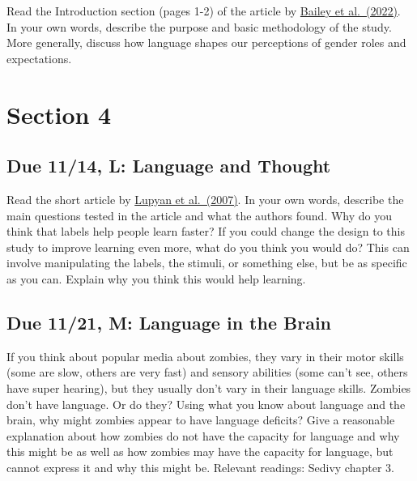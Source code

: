 \documentclass[
  letterpaper,
  DIV=11,
  numbers=noendperiod]{scrreprt}
\begin{document}
Read the Introduction section (pages 1-2) of the article by
\href{papers/Baileyetal2022.pdf}{Bailey et al.~(2022)}. In your own
words, describe the purpose and basic methodology of the study. More
generally, discuss how language shapes our perceptions of gender roles
and expectations.

\hypertarget{section-4}{%
\section*{\texorpdfstring{{Section 4}}{Section 4}}\label{section-4}}


\hypertarget{due-1114-l-language-and-thought}{%
\subsection*{Due 11/14, L: Language and
Thought}\label{due-1114-l-language-and-thought}}

Read the short article by \href{papers/Lupyanetal2007.pdf}{Lupyan et
al.~(2007)}. In your own words, describe the main questions tested in
the article and what the authors found. Why do you think that labels
help people learn faster? If you could change the design to this study
to improve learning even more, what do you think you would do? This can
involve manipulating the labels, the stimuli, or something else, but be
as specific as you can. Explain why you think this would help learning.

\hypertarget{due-1121-m-language-in-the-brain}{%
\subsection*{Due 11/21, M: Language in the
Brain}\label{due-1121-m-language-in-the-brain}}

If you think about popular media about zombies, they vary in their motor
skills (some are slow, others are very fast) and sensory abilities (some
can't see, others have super hearing), but they usually don't vary in
their language skills. Zombies don't have language. Or do they? Using
what you know about language and the brain, why might zombies appear to
have language deficits? Give a reasonable explanation about how zombies
do not have the capacity for language and why this might be as well as
how zombies may have the capacity for language, but cannot express it
and why this might be. Relevant readings: Sedivy chapter 3.
\end{document}
